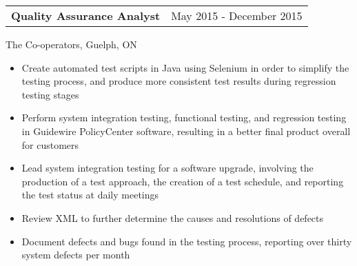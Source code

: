 \documentclass[12pt]{article}
\newcommand{\doublespace}{\vspace{8pt}}
\begin{document}
\doublespace

{
  \small
  \noindent\begin{tabu} {@{} X[l] X[r]}
    \textbf{Quality Assurance Analyst} & May 2015 - December 2015
  \end{tabu}
  The Co-operators, Guelph, ON
  \begin{itemize}
    \item Create automated test scripts in Java using Selenium in order to simplify the testing process, and produce more consistent test results during regression testing stages
    \item Perform system integration testing, functional testing, and regression testing in Guidewire PolicyCenter software, resulting in a better final product overall for customers
    \item Lead system integration testing for a software upgrade, involving the production of a test approach, the creation of a test schedule, and reporting the test status at daily meetings
    \item Review XML to further determine the causes and resolutions of defects
    \item Document defects and bugs found in the testing process, reporting over thirty system defects per month
  \end{itemize}
}
\end{document}
